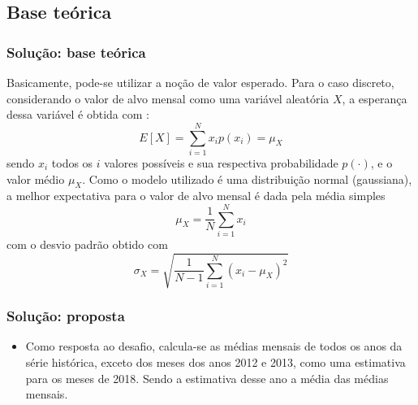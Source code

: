 \documentclass[xcolor=dvipsnames,xcolor=table]{beamer}
\newcommand{\Sum}{\sum\limits}
\begin{document}
\subsection{Base teórica}
\begin{frame}\frametitle{Solução: base teórica}

Basicamente, pode-se utilizar a noção de valor esperado. Para o caso discreto, considerando o valor de alvo mensal como uma variável aleatória $X$, a esperança dessa variável é obtida com \cite{soderstrom1989system}:
\begin{equation}
E \left [ X \right ] = \Sum_{i=1}^N x_i p(x_i) = \mu_X
\end{equation}
\noindent sendo $x_i$ todos os $i$ valores possíveis e sua respectiva probabilidade $p(\cdot)$, e o valor médio $\mu_X$. Como o modelo utilizado é uma distribuição normal (gaussiana), a melhor expectativa para o valor de alvo mensal é dada pela média simples
\begin{equation}
\mu_X = \frac{1}{N} \Sum_{i=1}^N x_i 
\end{equation}
\noindent com o desvio padrão obtido com
\begin{equation}
\sigma_X = \sqrt{\frac{1}{N-1} \Sum_{i=1}^N \left ( x_i - \mu_X \right )^2}
\end{equation}

\end{frame}

\begin{frame}\frametitle{Solução: proposta}

\begin{itemize}
\item Como resposta ao desafio, calcula-se as médias mensais de todos os anos da série histórica, exceto dos meses dos anos 2012 e 2013, como uma estimativa para os meses de 2018. Sendo a estimativa desse ano a média das médias mensais.
\end{itemize}

\end{frame}
\end{document}
